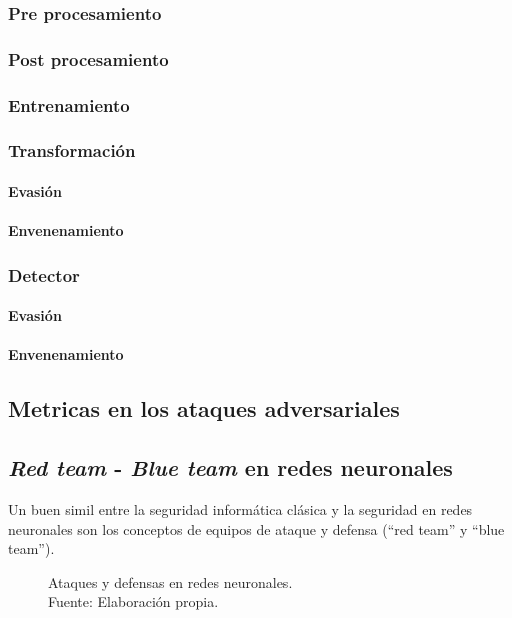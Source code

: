 \subsubsection{Pre procesamiento}
\subsubsection{Post procesamiento}
\subsubsection{Entrenamiento}
\subsubsection{Transformación}
\paragraph{Evasión}
\paragraph{Envenenamiento}
\subsubsection{Detector}
\paragraph{Evasión}
\paragraph{Envenenamiento}

\subsection{Metricas en los ataques adversariales}

\subsection{\textit{Red team} - \textit{Blue team} en redes neuronales}

Un buen simil entre la seguridad informática clásica y la seguridad en redes neuronales son los conceptos de equipos de ataque y defensa (``red team'' y ``blue team'').

\begin{figure}[H]
    \centering
    \centerline{}
    \caption{Ataques y defensas en redes neuronales.\\Fuente: Elaboración propia.}
    \label{fig:art-for-red-and-blue-teams}
\end{figure}

